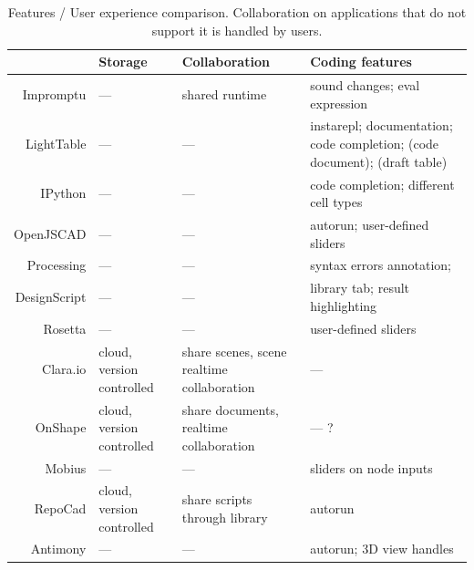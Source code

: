 \begin{table}
	\centering
	\renewcommand{\arraystretch}{1.2}

	\begin{tabulary}{\textwidth}{r|L|L|L|}
									& {\bf Storage} 						& {\bf Collaboration} 												& {\bf Coding features} \\
		\hline\hline
		Impromptu			& ---												& shared runtime															& sound changes; eval expression																						\\
		LightTable		& ---												& ---																					& instarepl; documentation; code completion; (code document); (draft table) \\
		IPython				& ---												& ---																					& code completion; different cell types																			\\
		OpenJSCAD			& ---												& ---																					& autorun; user-defined sliders																							\\
		Processing		& ---												& ---																					& syntax errors annotation;																									\\
		DesignScript	& ---												& ---																					& library tab; result highlighting																					\\
		Rosetta				& ---												& ---																					& user-defined sliders																											\\
		Clara.io			& cloud, version controlled	& share scenes, scene realtime collaboration	& ---																																				\\
		OnShape				& cloud, version controlled	& share documents, realtime collaboration			& --- ?																																			\\
		Mobius				& ---												& ---																					& sliders on node inputs																										\\
		RepoCad				& cloud, version controlled	& share scripts through library								& autorun																																		\\
		Antimony			& ---												& ---																					& autorun; 3D view handles																									\\
	\end{tabulary}
	\label{table:features:comp}
	\caption[Features / User experience comparison]{Features / User experience comparison. Collaboration on applications that do not support it is handled by users. }
\end{table}

